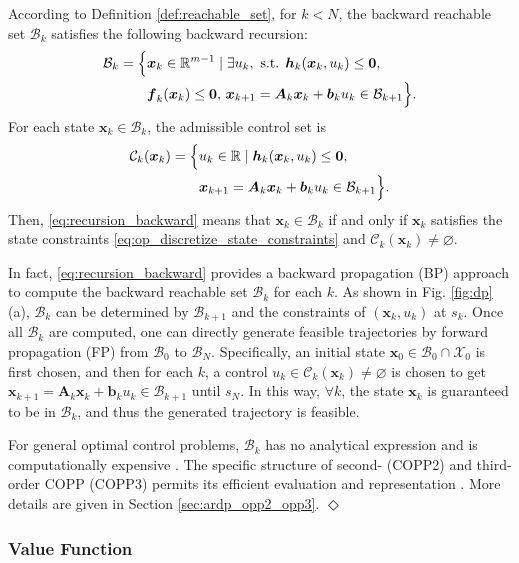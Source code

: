 \documentclass[journal]{IEEEtran}
\theoremstyle{definition}
\theoremstyle{definition}
\newtheorem*{remark}{Remark}
\let\oldremark\remark
\let\endoldremark\endremark
\renewenvironment{remark}
  {\oldremark}
  {\hfill$\Diamond$\endoldremark}
\newcommand\R{{\mathbb{R}}}
\renewcommand\vector[1]{\boldsymbol{#1}}
\newcommand\vb{{\vector{b}}}
\newcommand\vf{{\vector{f}}}
\newcommand\vh{{\vector{h}}}
\newcommand\vx{{\vector{x}}}
\newcommand\vA{{\vector{A}}}
\newcommand\vzero{{\vector{0}}}
\begin{document}
According to Definition \ref{def:reachable_set}, for $k<N$, the backward reachable set $\mathcal{B}_k$ satisfies the following backward recursion:
\begin{align}
    \mathcal{B}_k=\Big\{&\vx_k\in\R^{m-1}\mid\exists u_k,\text{ s.t. } \vh_k(\vx_k, u_k) \leq \vzero, \notag\\
    &\vf_k(\vx_k)\leq\vzero,\,\vx_{k+1}=\vA_k\vx_k+\vb_k u_k\in\mathcal{B}_{k+1}\Big\}.\label{eq:recursion_backward}
\end{align}
For each state $\vx_k \in \mathcal{B}_k$, the admissible control set is
\begin{align}
    \mathcal{C}_k(\vx_k) =\Big\{&u_k \in \R \mid \vh_k(\vx_k, u_k) \leq \vzero, \notag\\
    &\vx_{k+1}=\vA_k\vx_k+\vb_k u_k\in\mathcal{B}_{k+1}\Big\}.\label{eq:admissable_control_set}
\end{align}
Then, \eqref{eq:recursion_backward} means that $\vx_k\in\mathcal{B}_k$ if and only if $\vx_k$ satisfies the state constraints \eqref{eq:op_discretize_state_constraints} and $\mathcal{C}_k(\vx_k)\neq\varnothing$. 

In fact, \eqref{eq:recursion_backward} provides a backward propagation (BP) approach to compute the backward reachable set $\mathcal{B}_k$ for each $k$. As shown in Fig. \ref{fig:dp}(a), $\mathcal{B}_k$ can be determined by $\mathcal{B}_{k+1}$ and the constraints of $(\vx_k,u_k)$ at $s_k$. Once all $\mathcal{B}_k$ are computed, one can directly generate feasible trajectories by forward propagation (FP) from $\mathcal{B}_0$ to $\mathcal{B}_N$. Specifically, an initial state $\vx_0 \in \mathcal{B}_0\cap \mathcal{X}_0$ is first chosen, and then for each $k$, a control $u_k\in\mathcal{C}_k(\vx_k)\neq\varnothing$ is chosen to get $\vx_{k+1}=\vA_k\vx_k+\vb_k u_k\in\mathcal{B}_{k+1}$ until $s_N$. In this way, $\forall k$, the state $\vx_k$ is guaranteed to be in $\mathcal{B}_k$, and thus the generated trajectory is feasible.

\begin{remark}
    For general optimal control problems, $\mathcal{B}_k$ has no analytical expression and is computationally expensive \cite{bokanowski2010reachability}. The specific structure of second- (COPP2) and third-order COPP (COPP3) permits its efficient evaluation and representation \cite{pham2018new,dio2025time}. More details are given in Section \ref{sec:ardp_opp2_opp3}.
\end{remark}

\subsubsection{Value Function}
\end{document}
